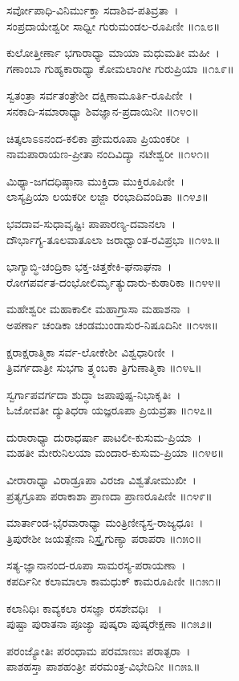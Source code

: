 ಸರ್ವೋಪಾಧಿ-ವಿನಿರ್ಮುಕ್ತಾ ಸದಾಶಿವ-ಪತಿವ್ರತಾ~।\\
ಸಂಪ್ರದಾಯೇಶ್ವರೀ ಸಾಧ್ವೀ ಗುರುಮಂಡಲ-ರೂಪಿಣೀ ॥೧೩೮॥

ಕುಲೋತ್ತೀರ್ಣಾ ಭಗಾರಾಧ್ಯಾ ಮಾಯಾ ಮಧುಮತೀ ಮಹೀ~।\\
ಗಣಾಂಬಾ ಗುಹ್ಯಕಾರಾಧ್ಯಾ ಕೋಮಲಾಂಗೀ ಗುರುಪ್ರಿಯಾ ॥೧೩೯॥

ಸ್ವತಂತ್ರಾ ಸರ್ವತಂತ್ರೇಶೀ ದಕ್ಷಿಣಾಮೂರ್ತಿ-ರೂಪಿಣೀ~।\\
ಸನಕಾದಿ-ಸಮಾರಾಧ್ಯಾ ಶಿವಜ್ಞಾನ-ಪ್ರದಾಯಿನೀ ॥೧೪೦॥

ಚಿತ್ಕಲಾಽಽನಂದ-ಕಲಿಕಾ ಪ್ರೇಮರೂಪಾ ಪ್ರಿಯಂಕರೀ~।\\
ನಾಮಪಾರಾಯಣ-ಪ್ರೀತಾ ನಂದಿವಿದ್ಯಾ ನಟೇಶ್ವರೀ ॥೧೪೧॥

ಮಿಥ್ಯಾ-ಜಗದಧಿಷ್ಠಾನಾ ಮುಕ್ತಿದಾ ಮುಕ್ತಿರೂಪಿಣೀ~।\\
ಲಾಸ್ಯಪ್ರಿಯಾ ಲಯಕರೀ ಲಜ್ಜಾ ರಂಭಾದಿವಂದಿತಾ ॥೧೪೨॥

ಭವದಾವ-ಸುಧಾವೃಷ್ಟಿಃ ಪಾಪಾರಣ್ಯ-ದವಾನಲಾ~।\\
ದೌರ್ಭಾಗ್ಯ-ತೂಲವಾತೂಲಾ ಜರಾಧ್ವಾಂತ-ರವಿಪ್ರಭಾ ॥೧೪೩॥

ಭಾಗ್ಯಾಬ್ಧಿ-ಚಂದ್ರಿಕಾ ಭಕ್ತ-ಚಿತ್ತಕೇಕಿ-ಘನಾಘನಾ~।\\
ರೋಗಪರ್ವತ-ದಂಭೋಲಿರ್ಮೃತ್ಯುದಾರು-ಕುಠಾರಿಕಾ ॥೧೪೪॥

ಮಹೇಶ್ವರೀ ಮಹಾಕಾಲೀ ಮಹಾಗ್ರಾಸಾ ಮಹಾಶನಾ~।\\
ಅಪರ್ಣಾ ಚಂಡಿಕಾ ಚಂಡಮುಂಡಾಸುರ-ನಿಷೂದಿನೀ ॥೧೪೫॥

ಕ್ಷರಾಕ್ಷರಾತ್ಮಿಕಾ ಸರ್ವ-ಲೋಕೇಶೀ ವಿಶ್ವಧಾರಿಣೀ~।\\
ತ್ರಿವರ್ಗದಾತ್ರೀ ಸುಭಗಾ ತ್ರ್ಯಂಬಕಾ ತ್ರಿಗುಣಾತ್ಮಿಕಾ ॥೧೪೬॥

ಸ್ವರ್ಗಾಪವರ್ಗದಾ ಶುದ್ಧಾ ಜಪಾಪುಷ್ಪ-ನಿಭಾಕೃತಿಃ~।\\
ಓಜೋವತೀ ದ್ಯುತಿಧರಾ ಯಜ್ಞರೂಪಾ ಪ್ರಿಯವ್ರತಾ ॥೧೪೭॥

ದುರಾರಾಧ್ಯಾ ದುರಾಧರ್ಷಾ ಪಾಟಲೀ-ಕುಸುಮ-ಪ್ರಿಯಾ~।\\
ಮಹತೀ ಮೇರುನಿಲಯಾ ಮಂದಾರ-ಕುಸುಮ-ಪ್ರಿಯಾ ॥೧೪೮॥

ವೀರಾರಾಧ್ಯಾ ವಿರಾಡ್ರೂಪಾ ವಿರಜಾ ವಿಶ್ವತೋಮುಖೀ~।\\
ಪ್ರತ್ಯಗ್ರೂಪಾ ಪರಾಕಾಶಾ ಪ್ರಾಣದಾ ಪ್ರಾಣರೂಪಿಣೀ ॥೧೪೯॥

ಮಾರ್ತಾಂಡ-ಭೈರವಾರಾಧ್ಯಾ ಮಂತ್ರಿಣೀನ್ಯಸ್ತ-ರಾಜ್ಯಧೂಃ~।\\
ತ್ರಿಪುರೇಶೀ ಜಯತ್ಸೇನಾ ನಿಸ್ತ್ರೈಗುಣ್ಯಾ ಪರಾಪರಾ ॥೧೫೦॥

ಸತ್ಯ-ಜ್ಞಾನಾನಂದ-ರೂಪಾ ಸಾಮರಸ್ಯ-ಪರಾಯಣಾ~।\\
ಕಪರ್ದಿನೀ ಕಲಾಮಾಲಾ ಕಾಮಧುಕ್ ಕಾಮರೂಪಿಣೀ ॥೧೫೧॥

ಕಲಾನಿಧಿಃ ಕಾವ್ಯಕಲಾ ರಸಜ್ಞಾ ರಸಶೇವಧಿಃ ~।\\
ಪುಷ್ಟಾ ಪುರಾತನಾ ಪೂಜ್ಯಾ ಪುಷ್ಕರಾ ಪುಷ್ಕರೇಕ್ಷಣಾ ॥೧೫೨॥

ಪರಂಜ್ಯೋತಿಃ ಪರಂಧಾಮ ಪರಮಾಣುಃ ಪರಾತ್ಪರಾ~।\\
ಪಾಶಹಸ್ತಾ ಪಾಶಹಂತ್ರೀ ಪರಮಂತ್ರ-ವಿಭೇದಿನೀ ॥೧೫೩॥

